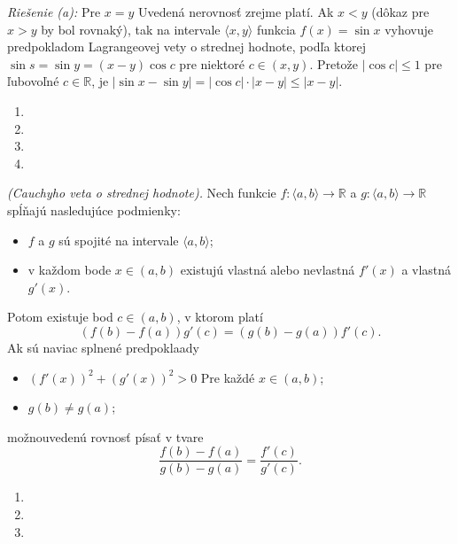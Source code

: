 \textit{Riešenie (a):}
Pre $x=y$ Uvedená nerovnosť zrejme platí. Ak $x<y$ (dôkaz pre $x>y$ by bol rovnaký), tak na intervale $\langle x,y \rangle$ funkcia $f(x)=\sin x$ vyhovuje predpokladom Lagrangeovej vety o strednej hodnote, podľa ktorej $\sin s=\sin y=(x-y)\cos c$ pre niektoré $c\in (x,y)$. Pretože $|\cos c|\leq 1$ pre ľubovoľné $c\in\mathbb{R}$, je $|\sin x-\sin y|=|\cos c|\cdot|x-y|\leq |x-y|$.

\begin{enumerate}[resume]
	\item {}
	\item {}
	\item {}
	\item {}
\end{enumerate}

\begin{veta}
\textit{(Cauchyho veta o strednej hodnote).}
Nech funkcie $f: \langle a,b \rangle \rightarrow \mathbb{R}$ a $g: \langle a,b \rangle \rightarrow \mathbb{R}$ spĺňajú nasledujúce podmienky:
\begin{itemize}
\item $f$ a $g$ sú spojité na intervale $\langle a,b \rangle$; 
\item v každom bode $x\in (a,b)$ existujú vlastná alebo nevlastná $f'(x)$ a vlastná $g'(x)$.
\end{itemize}
Potom existuje bod $c\in (a,b)$, v ktorom platí
$$(f(b)-f(a))g'(c)=(g(b)-g(a))f'(c).$$
Ak sú naviac splnené predpoklaady
\begin{itemize}
\item $(f'(x))^2+(g'(x))^2>0$ Pre každé $x\in (a,b)$;
\item $g(b)\neq g(a)$;
\end{itemize}
možnouvedenú rovnosť písať v tvare 
$$\frac{f(b)-f(a)}{g(b)-g(a)}=\frac{f'(c)}{g'(c)}.$$
\end{veta}

\begin{enumerate}[resume]
	\item {}
	\item {}
	\item {}
\end{enumerate}

